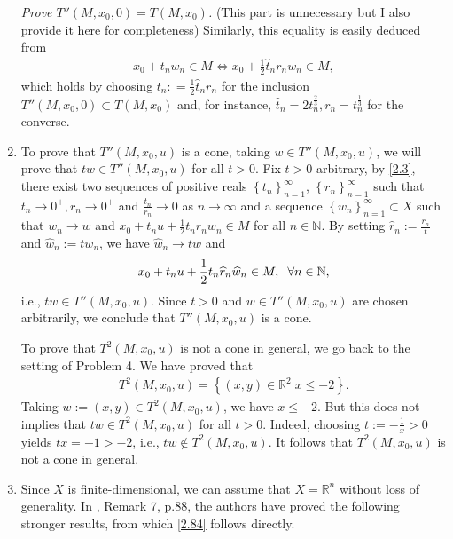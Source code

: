 \documentclass[a4paper]{article}
\numberwithin{equation}{section}
\begin{document}
\begin{enumerate}
\textit{Prove $T''\left(M,x_0,0\right) =T\left(M,x_0\right)$.} (This part is unnecessary but I also provide it here for completeness) Similarly, this equality is easily deduced from
\begin{align}
{x_0} + {t_n}{w_n} \in M \Leftrightarrow {x_0} + \frac{1}{2}{\widehat t_n}{r_n}{w_n} \in M,
\end{align}
which holds by choosing ${t_n}: = \frac{1}{2}{\widehat t_n}{r_n}$ for the inclusion $T''\left( {M,{x_0},0} \right) \subset T\left( {M,{x_0}} \right)$ and, for instance, ${\widehat t_n} = 2t_n^{\frac{2}{3}},{r_n} = t_n^{\frac{1}{3}}$ for the converse. 
\item To prove that $T''\left(M,x_0,u\right)$ is a cone, taking $w\in T''\left(M,x_0,u\right)$, we will prove that $tw\in T''\left(M,x_0,u\right)$ for all $t>0$. Fix $t>0$ arbitrary, by \eqref{2.3}, there exist two sequences of positive reals $\left\{ {{t_n}} \right\}_{n = 1}^\infty $, $\left\{ {{r_n}} \right\}_{n = 1}^\infty $ such that $t_n\to 0^+,r_n\to 0^+$ and $\frac{t_n}{r_n}\to 0$ as $n\to \infty$ and a sequence $\left\{ {{w_n}} \right\}_{n = 1}^\infty  \subset X$ such that $w_n\to w$ and $x_0+t_n u+\frac{1}{2}t_nr_nw_n\in M$ for all $n\in \mathbb{N}$. By setting $\widehat{r}_n:=\frac{r_n}{t}$ and $\widehat{w}_n:=tw_n$, we have $\widehat{w}_n\to tw$ and
\begin{align}
{x_0} + {t_n}u + \frac{1}{2}{t_n}{\widehat r_n}{\widehat w_n} \in M,\hspace{0.2cm}\forall n \in \mathbb{N},
\end{align}
i.e., $tw\in T''\left(M,x_0,u\right)$. Since $t>0$ and $w\in T''\left(M,x_0,u\right)$ are chosen arbitrarily, we conclude that $T''\left(M,x_0,u\right)$ is a cone.

To prove that $T^2\left(M,x_0,u\right)$ is not a cone in general, we go back to the setting of Problem 4. We have proved that
\begin{align}
{T^2}\left( {M,{x_0},u} \right) = \left\{ {\left( {x,y} \right) \in {\mathbb{R}^2}|x \le  - 2} \right\}.
\end{align} 
Taking $w:=\left(x,y\right)\in T^2\left(M,x_0,u\right)$, we have $x\le -2$. But this does not implies that $tw \in T^2\left(M,x_0,u\right)$ for all $t>0$. Indeed, choosing $t:=-\frac{1}{x}>0$ yields $tx =-1>-2$, i.e., $tw\notin T^2\left(M,x_0,u\right)$. It follows that $T^2\left(M,x_0,u\right)$ is not a cone in general.
\item Since $X$ is finite-dimensional, we can assume that $X=\mathbb{R}^n$ without loss of generality. In \cite{4}, Remark 7, p.88, the authors have proved the following stronger results, from which \eqref{2.84} follows directly.
\end{enumerate}
\end{document}
